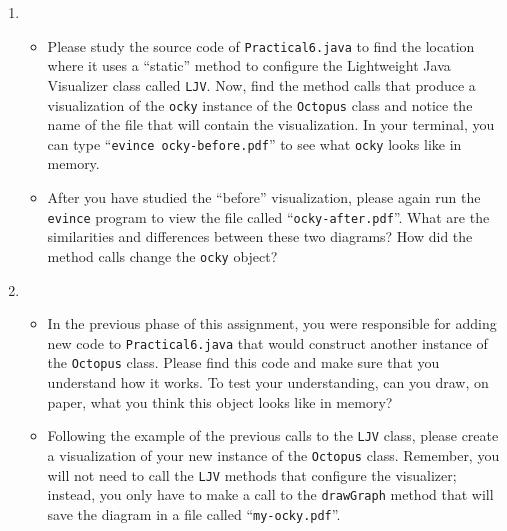 \begin{enumerate}
\item

\begin{itemize}


  \item Please study the source code of {\tt Practical6.java} to find the location where it uses a ``static'' method to
    configure the Lightweight Java Visualizer class called {\tt LJV}. Now, find the method calls that produce a
    visualization of the {\tt ocky} instance of the {\tt Octopus} class and notice the name of the file that will
    contain the visualization. In your terminal, you can type ``{\tt evince ocky-before.pdf}'' to see what {\tt ocky}
    looks like in memory.

  \item After you have studied the ``before'' visualization, please again run the {\tt evince} program to view the file
    called ``{\tt ocky-after.pdf}''. What are the similarities and differences between these two diagrams? How did the
    method calls change the {\tt ocky} object?

\end{itemize}

\item
  \begin{itemize}

    \item In the previous phase of this assignment, you were responsible for adding new code to {\tt Practical6.java}
      that would construct another instance of the {\tt Octopus} class.  Please find this code and make sure that you
      understand how it works. To test your understanding, can you draw, on paper, what you think this object looks like
      in memory?

    \item Following the example of the previous calls to the {\tt LJV} class, please create a visualization of your
      new instance of the {\tt Octopus} class. Remember, you will not need to call the {\tt LJV} methods that configure
      the visualizer; instead, you only have to make a call to the {\tt drawGraph} method that will save the diagram in
      a file called ``{\tt my-ocky.pdf}''.

  \end{itemize}
\end{enumerate}

